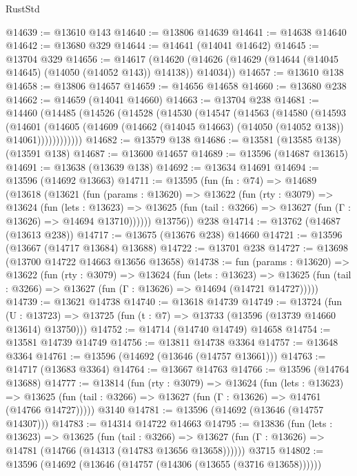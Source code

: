 \begin{lexlean}{RustStd}
\begin{coremodule}
@14639 := @13610 @143
@14640 := @13806 @14639
@14641 := @14638 @14640
@14642 := @13680 @329
@14644 := @14641 (@14041 @14642)
@14645 := @13704 @329
@14656 := @14617
    (@14620 (@14626 (@14629 (@14644 (@14045 @14645) (@14050 (@14052 @143)) @14138)) @14034))
@14657 := @13610 @138
@14658 := @13806 @14657
@14659 := @14656 @14658
@14660 := @13680 @238
@14662 := @14659 (@14041 @14660)
@14663 := @13704 @238
@14681 := @14460
    (@14485
      (@14526
        (@14528
          (@14530
            (@14547
              (@14563
                (@14580
                  (@14593
                    (@14601
                      (@14605
                        (@14609 (@14662 (@14045 @14663) (@14050 (@14052 @138)) @14061))))))))))))
@14682 := @13579 @138
@14686 := @13581 (@13585 @138) (@13591 @138)
@14687 := @13600 @14657
@14689 := @13596 (@14687 @13615)
@14691 := @13638 (@13639 @138)
@14692 := @13634 @14691
@14694 := @13596 (@14692 @13663)
@14711 := @13595
    (fun (fn : @74) =>
    @14689
      (@13618
        (@13621
          (fun (params : @13620) =>
          @13622
            (fun (rty : @3079) =>
            @13624
              (fun (lets : @13623) =>
              @13625 (fun (tail : @3266) => @13627 (fun (Γ : @13626) => @14694 @13710))))))
        @13756))
    @238
@14714 := @13762 (@14687 (@13613 @238))
@14717 := @13675 (@13676 @238) @14660
@14721 := @13596 (@13667 (@14717 @13684) @13688)
@14722 := @13701 @238
@14727 := @13698 (@13700 @14722 @14663 @13656 @13658)
@14738 := fun (params : @13620) =>
  @13622
    (fun (rty : @3079) =>
    @13624
      (fun (lets : @13623) =>
      @13625 (fun (tail : @3266) => @13627 (fun (Γ : @13626) => @14694 (@14721 @14727)))))
@14739 := @13621 @14738
@14740 := @13618 @14739
@14749 := @13724
    (fun (U : @13723) => @13725 (fun (t : @7) => @13733 (@13596 (@13739 @14660 @13614) @13750)))
@14752 := @14714 (@14740 @14749) @14658
@14754 := @13581 @14739 @14749
@14756 := @13811 @14738 @3364
@14757 := @13648 @3364
@14761 := @13596 (@14692 (@13646 (@14757 @13661)))
@14763 := @14717 (@13683 @3364)
@14764 := @13667 @14763
@14766 := @13596 (@14764 @13688)
@14777 := @13814
    (fun (rty : @3079) =>
    @13624
      (fun (lets : @13623) =>
      @13625 (fun (tail : @3266) => @13627 (fun (Γ : @13626) => @14761 (@14766 @14727)))))
    @3140
@14781 := @13596 (@14692 (@13646 (@14757 @14307)))
@14783 := @14314 @14722 @14663
@14795 := @13836
    (fun (lets : @13623) =>
    @13625
      (fun (tail : @3266) =>
      @13627 (fun (Γ : @13626) => @14781 (@14766 (@14313 (@14783 @13656 @13658))))))
    @3715
@14802 := @13596 (@14692 (@13646 (@14757 (@14306 (@13655 (@3716 @13658))))))

\end{coremodule}
\end{lexlean}
